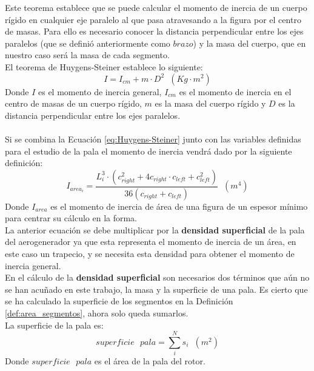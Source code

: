 Este teorema establece que se puede calcular el momento de inercia de un cuerpo rígido en cualquier eje paralelo al que pasa atravesando a la figura por el centro de masas. Para ello es necesario conocer la distancia perpendicular entre los ejes paralelos (que se definió anteriormente como $brazo$) y la masa del cuerpo, que en nuestro caso será la masa de cada segmento. \\

El teorema de Huygens-Steiner establece lo siguiente:
 \begin{equation}
    I = I_{cm} + m \cdot D^2 \hspace{7pt} (Kg \cdot m^2)
 \label{eq:Huygens-Steiner}
 \end{equation}
 Donde $I$ es el momento de inercia general, $I_{cm}$ es el momento de inercia en el centro de masas de un cuerpo rígido, $m$ es la masa del cuerpo rígido y $D$ es la distancia perpendicular entre los ejes paralelos.\\\\
 

Si se combina la Ecuación \ref{eq:Huygens-Steiner} junto con las variables definidas para el estudio de la pala el momento de inercia vendrá dado por la siguiente definición:
 \begin{equation}
  I_{area_i} = \dfrac{ L_{i}^3 \cdot (c_{right}^2 + 4 c_{right} \cdot c_{left} + c_{left}^2)}{ 36 (c_{right} + c_{left})} \hspace{7pt} (m^4)
 \label{def:momento_inercia_area}
 \end{equation}
 Donde $I_{area}$ es el momento de inercia de área de una figura de un espesor mínimo para centrar su cálculo en la forma.\\
 
 La anterior ecuación se debe multiplicar por la \textbf{densidad superficial} de la pala del aerogenerador ya que esta representa el momento de inercia de un área, en este caso un trapecio, y se necesita esta densidad para obtener el momento de inercia general.\\

En el cálculo de la \textbf{densidad superficial} son necesarios dos términos que aún no se han acuñado en este trabajo, la masa y la superficie de una pala. Es cierto que se ha calculado la superficie de los segmentos en la Definición \ref{def:area_segmentos}, ahora solo queda sumarlos.\\


La superficie de la pala es:
 \begin{equation}
 superficie \text{ } pala = \sum_{i}^{N}s_i \hspace{7pt} (m^2)  
 \label{def:superficie_pala}
 \end{equation}
  Donde $ superficie \text{ } pala $ es el área de la pala del rotor.\\

